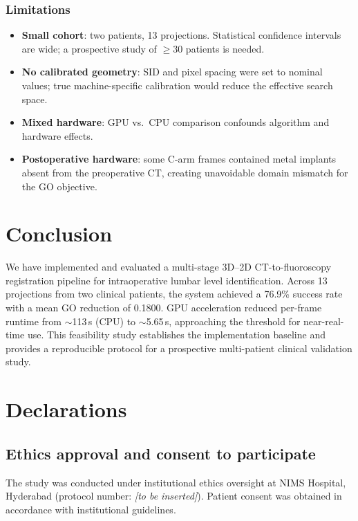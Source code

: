 \documentclass[10pt,a4paper]{article}
\begin{document}
\subsubsection*{Limitations}

\begin{itemize}
  \item \textbf{Small cohort}: two patients, 13 projections.
        Statistical confidence intervals are wide; a prospective
        study of $\geq$30 patients is needed.
  \item \textbf{No calibrated geometry}: SID and pixel spacing were
        set to nominal values; true machine-specific calibration
        would reduce the effective search space.
  \item \textbf{Mixed hardware}: GPU vs.\ CPU comparison confounds
        algorithm and hardware effects.
  \item \textbf{Postoperative hardware}: some C-arm frames contained
        metal implants absent from the preoperative CT, creating
        unavoidable domain mismatch for the GO objective.
\end{itemize}

\section{Conclusion}
\label{sec:conclusion}

We have implemented and evaluated a multi-stage 3D--2D CT-to-fluoroscopy
registration pipeline for intraoperative lumbar level identification.
Across 13 projections from two clinical patients, the system achieved a
76.9\% success rate with a mean GO reduction of 0.1800.
GPU acceleration reduced per-frame runtime from $\sim$113\,s (CPU) to
$\sim$5.65\,s, approaching the threshold for near-real-time use.
This feasibility study establishes the implementation baseline and
provides a reproducible protocol for a prospective multi-patient
clinical validation study.

\section*{Declarations}

\subsection*{Ethics approval and consent to participate}
The study was conducted under institutional ethics oversight at NIMS
Hospital, Hyderabad (protocol number: \textit{[to be inserted]}).
Patient consent was obtained in accordance with institutional guidelines.
\end{document}
